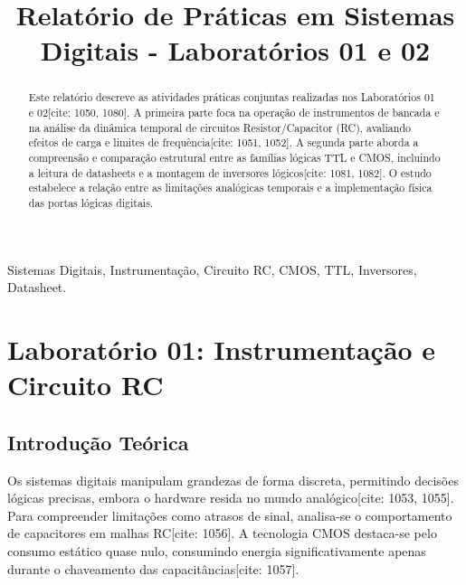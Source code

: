\documentclass[conference]{IEEEtran}
\begin{document}
\title{Relatório de Práticas em Sistemas Digitais - Laboratórios 01 e 02}

\author{
}

\maketitle

\begin{abstract}
Este relatório descreve as atividades práticas conjuntas realizadas nos Laboratórios 01 e 02[cite: 1050, 1080]. A primeira parte foca na operação de instrumentos de bancada e na análise da dinâmica temporal de circuitos Resistor/Capacitor (RC), avaliando efeitos de carga e limites de frequência[cite: 1051, 1052]. A segunda parte aborda a compreensão e comparação estrutural entre as famílias lógicas TTL e CMOS, incluindo a leitura de datasheets e a montagem de inversores lógicos[cite: 1081, 1082]. O estudo estabelece a relação entre as limitações analógicas temporais e a implementação física das portas lógicas digitais.
\end{abstract}

\begin{IEEEkeywords}
Sistemas Digitais, Instrumentação, Circuito RC, CMOS, TTL, Inversores, Datasheet.
\end{IEEEkeywords}

\section{Laboratório 01: Instrumentação e Circuito RC}

\subsection{Introdução Teórica}
Os sistemas digitais manipulam grandezas de forma discreta, permitindo decisões lógicas precisas, embora o hardware resida no mundo analógico[cite: 1053, 1055]. Para compreender limitações como atrasos de sinal, analisa-se o comportamento de capacitores em malhas RC[cite: 1056]. A tecnologia CMOS destaca-se pelo consumo estático quase nulo, consumindo energia significativamente apenas durante o chaveamento das capacitâncias[cite: 1057].
\end{document}
